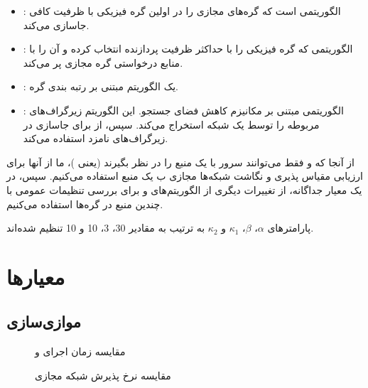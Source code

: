   \begin{itemize}
  	\item 
  	:
  	الگوریتمی ‌است که گره‌های مجازی را در اولین گره فیزیکی با ظرفیت کافی جاسازی می‌کند.
  	\item 
  	:
  	الگوریتمی که گره فیزیکی را با حداکثر ظرفیت پردازنده انتخاب کرده و آن را با منابع درخواستی گره مجازی پر می‌کند.
  	\item 
  	:
  	یک الگوریتم مبتنی بر رتبه بندی گره.
  	\item 
  	:
  	الگوریتمی مبتنی بر مکانیزم کاهش فضای جستجو. این الگوریتم زیرگراف‌های مربوطه را توسط یک شبکه  استخراج می‌کند. سپس‌، از  برای جاسازی  در زیرگراف‌های نامزد استفاده می‌کند.
  \end{itemize}

  	از آنجا که  و  فقط می‌توانند سرور با یک منبع را در نظر بگیرند (یعنی )‌، ما از آنها برای ارزیابی مقیاس پذیری و نگاشت شبکه‌ها مجازی ب یک منبع استفاده می‌کنیم. سپس‌، در یک معیار جداگانه‌، از تغییرات دیگری از الگوریتم‌های  و  برای بررسی تنظیمات عمومی با چندین منبع در گره‌ها استفاده می‌کنیم.
  	
  	پارامتر‌های $\alpha$، $\beta$‌، $\kappa_1$ و $\kappa_2$ به ترتیب به مقادیر 30‌، 3‌، 10 و 10 تنظیم شده‌اند. 
  	\section{معیار‌ها}
  	\subsection{موازی‌سازی}
  	
  	\begin{figure}
  		\centering
  		\begin{minipage}[t]{.48\linewidth}
  			\centering
  			\resizebox{\linewidth}{!}{%
  				
  			}%
  			\caption{
  			مقایسه زمان اجرای  و 
  		}
  			\label{fig:gpu-cpu-comparision}
  		\end{minipage}\hfill
  		\begin{minipage}[t]{.48\linewidth}
  			\centering
  			\resizebox{\linewidth}{!}{%
  				
  			}
  			\caption{
  			مقایسه نرخ پذیرش شبکه مجازی
  		}
  			\label{fig:ar1}
  		\end{minipage}
  	\end{figure}
  
